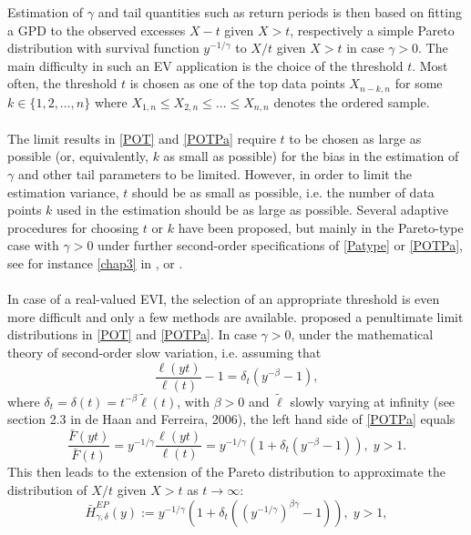 Estimation of $\gamma$ and tail quantities such as return periods is then based on fitting a GPD to the observed excesses $X-t$ given $X>t$, respectively a simple Pareto distribution with survival function $y^{-1/\gamma}$ to $X/t$ given $X>t$ in case $\gamma >0$.
The main difficulty in such an EV application is the choice of the threshold $t$. Most often, the threshold $t$ is chosen as one of the top data points $X_{n-k,n}$ for some $k \in \{1,2, \ldots,n \}$ where $X_{1,n} \leq X_{2,n} \leq \ldots \leq X_{n,n}$ denotes the ordered sample.
\\\\
The limit results in \eqref{POT} and \eqref{POTPa} require $t$ to be chosen as large as possible (or, equivalently, $k$ as small as possible) for the bias in the estimation of $\gamma$ and other tail parameters to be limited. However, in order to limit the estimation variance, $t$ should be as small as possible, i.e. the number of data points $k$ used in the estimation should be as large as possible. Several adaptive procedures for choosing $t$ or $k$ have been proposed, but mainly in the Pareto-type case with $\gamma >0$ under further second-order specifications of \eqref{Patype} or \eqref{POTPa}, see for instance \autoref{chap3} in \cite{sts626}, or \cite{matthys2000adaptive}.
\\\\
In case of a real-valued EVI, the selection of an appropriate threshold is even more difficult and only a few methods are available. \cite{beirlant2009second} proposed a penultimate limit distributions in \eqref{POT} and \eqref{POTPa}. In case $\gamma >0$, under the mathematical theory of second-order slow variation, i.e. assuming that 
\begin{equation}
\dfrac{\ell(yt)}{\ell (t)} - 1 =\delta_t 
\left( y^{-\beta}-1 \right),
\label{SO}
\end{equation}
where $\delta_t=\delta (t)= t^{-\beta}\tilde{\ell}(t)$, with $\beta >0$ and $\tilde\ell$ slowly varying at infinity (see section 2.3 in de Haan and Ferreira, 2006), the left hand side of \eqref{POTPa} equals
\[
\dfrac{\bar{F}(yt)}{\bar{F}(t)} = 
y^{-1/\gamma} \dfrac{\ell(yt)}{\ell (t)} =
y^{-1/\gamma} \left( 1 + \delta_t (y^{-\beta}-1)\right), \; y>1.
\]
This then leads to the extension of the Pareto distribution to approximate the distribution of $X/t$ given $X>t$ as $t \to \infty$:
\begin{equation}
\bar{H}_{\gamma,\delta}^{EP}(y) := y^{-1/\gamma}\left( 1+ \delta_t \left( (y^{-1/\gamma})^{\beta\gamma}-1\right)\right), \; y>1,
\label{EP}
\end{equation}
